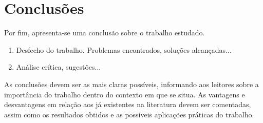 


\section{Conclusões} 

Por fim, apresenta-se uma conclusão sobre o trabalho estudado.
\begin{enumerate}								
	\item  Desfecho do trabalho. Problemas encontrados, soluções alcançadas...
	\item  Análise crítica, sugestões...	
\end{enumerate}


As conclusões devem ser as mais claras possíveis, informando aos leitores sobre a importância do trabalho dentro do contexto em que se situa. As vantagens e desvantagens em relação aos já existentes na literatura devem ser comentadas, assim como os resultados obtidos e as possíveis aplicações práticas do trabalho.





\balance


